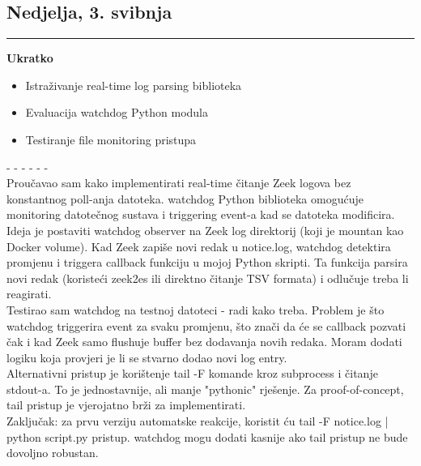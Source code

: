 \documentclass[12pt, a4paper]{article}
\newcommand{\dan}[1]{
    \subsection*{#1}
    \vspace{-0.5em} 
    \hrule \vspace{0.5em} 
}
\begin{document}
\dan{Nedjelja, 3. svibnja}
\textbf{Ukratko}
\begin{itemize}
    \item Istraživanje real-time log parsing biblioteka
    \item Evaluacija watchdog Python modula
    \item Testiranje file monitoring pristupa
\end{itemize}
- - - - - - \\
Proučavao sam kako implementirati real-time čitanje Zeek logova bez konstantnog poll-anja datoteka. watchdog Python biblioteka omogućuje monitoring datotečnog sustava i triggering event-a kad se datoteka modificira.
\\
Ideja je postaviti watchdog observer na Zeek log direktorij (koji je mountan kao Docker volume). Kad Zeek zapiše novi redak u notice.log, watchdog detektira promjenu i triggera callback funkciju u mojoj Python skripti. Ta funkcija parsira novi redak (koristeći zeek2es ili direktno čitanje TSV formata) i odlučuje treba li reagirati.
\\
Testirao sam watchdog na testnoj datoteci - radi kako treba. Problem je što watchdog triggerira event za svaku promjenu, što znači da će se callback pozvati čak i kad Zeek samo flushuje buffer bez dodavanja novih redaka. Moram dodati logiku koja provjeri je li se stvarno dodao novi log entry.
\\
Alternativni pristup je korištenje tail -F komande kroz subprocess i čitanje stdout-a. To je jednostavnije, ali manje "pythonic" rješenje. Za proof-of-concept, tail pristup je vjerojatno brži za implementirati.
\\
Zaključak: za prvu verziju automatske reakcije, koristit ću tail -F notice.log | python script.py pristup. watchdog mogu dodati kasnije ako tail pristup ne bude dovoljno robustan.
\end{document}
